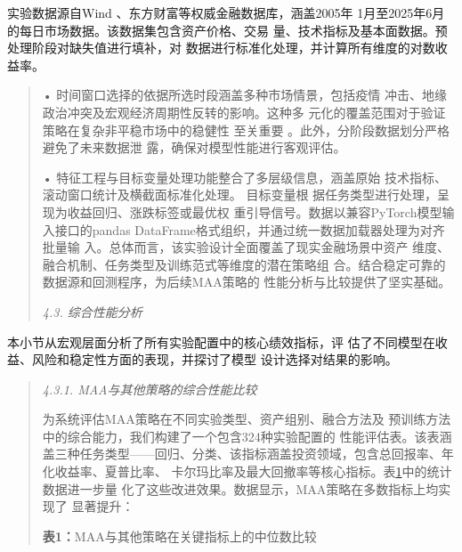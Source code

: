 \documentclass[UTF8]{ctexart}
\begin{document}
实验数据源自Wind 、东方财富等权威金融数据库，涵盖2005年
1月至2025年6月的每日市场数据。该数据集包含资产价格、交易
量、技术指标及基本面数据。预处理阶段对缺失值进行填补，对
数据进行标准化处理，并计算所有维度的对数收益率。

\begin{quote}
• 时间窗口选择的依据所选时段涵盖多种市场情景，包括疫情
冲击、地缘政治冲突及宏观经济周期性反转的影响。这种多
元化的覆盖范围对于验证策略在复杂非平稳市场中的稳健性 至关重要
。此外，分阶段数据划分严格避免了未来数据泄
露，确保对模型性能进行客观评估。

• 特征工程与目标变量处理功能整合了多层级信息，涵盖原始
技术指标、滚动窗口统计及横截面标准化处理。 目标变量根
据任务类型进行处理，呈现为收益回归、涨跌标签或最优权
重引导信号。数据以兼容PyTorch模型输入接口的pandas
DataFrame格式组织，并通过统一数据加载器处理为对齐批量输
入。总体而言，该实验设计全面覆盖了现实金融场景中资产
维度、融合机制、任务类型及训练范式等维度的潜在策略组
合。结合稳定可靠的数据源和回测程序，为后续MAA策略的
性能分析与比较提供了坚实基础。

\emph{4.3. 综合性能分析}
\end{quote}

本小节从宏观层面分析了所有实验配置中的核心绩效指标，评
估了不同模型在收益、风险和稳定性方面的表现，并探讨了模型
设计选择对结果的影响。

\begin{quote}
\emph{4.3.1. MAA与其他策略的综合性能比较}

为系统评估MAA策略在不同实验类型、资产组别、融合方法及
预训练方法中的综合能力，我们构建了一个包含324种实验配置的
性能评估表。该表涵盖三种任务类型------回归、分类、该指标涵盖投资领域，包含总回报率、年化收益率、夏普比率、
卡尔玛比率及最大回撤率等核心指标。表\hyperref[bookmark46]{1}中的统计数据进一步量
化了这些改进效果。数据显示，MAA策略在多数指标上均实现了 显著提升：

\textbf{表1：}MAA与其他策略在关键指标上的中位数比较
\end{quote}
\end{document}
